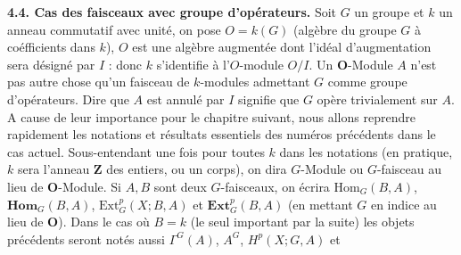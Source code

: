 \textbf{4.4. Cas des faisceaux avec groupe d'opérateurs.}
Soit $G$ un groupe et $k$ un anneau commutatif avec unité, on pose $O=k(G)$
(algèbre du groupe $G$ à coéfficients dans $k$), $O$ est une algèbre augmentée
dont l'idéal d'augmentation sera désigné par $I$ : donc $k$ s'identifie à
l'$O$-module $O/I$. Un $\mathbf O$-Module $A$ n'est pas autre chose qu'un faisceau de
$k$-modules admettant $G$ comme groupe d'opérateurs. Dire que $A$ est annulé
par $I$ signifie que $G$ opère trivialement sur $A$. A cause de leur
importance pour le chapitre suivant, nous allons reprendre rapidement les
notations et résultats essentiels des numéros précédents dans le cas actuel.
Sous-entendant une fois pour toutes $k$ dans les notations (en pratique, $k$
sera l'anneau $\mathbf Z$ des entiers, ou un corps), on dira $G$-Module ou
$G$-faisceau au lieu de $\mathbf O$-Module. Si $A,B$ sont deux $G$-faisceaux, on
écrira $\mathrm{Hom}_G(B,A)$, $\mathbf{Hom}_G(B,A)$,
$\mathrm{Ext}_G^p(X;B,A)$ et $\mathbf{Ext}_G^p(B,A)$ (en mettant $G$ en indice
au lieu de $\mathbf O$). Dans le cas où $B=k$ (le seul important par la suite) les
objets précédents seront notés aussi $\Gamma^G(A)$, $A^G$, $H^p(X;G,A)$ et

